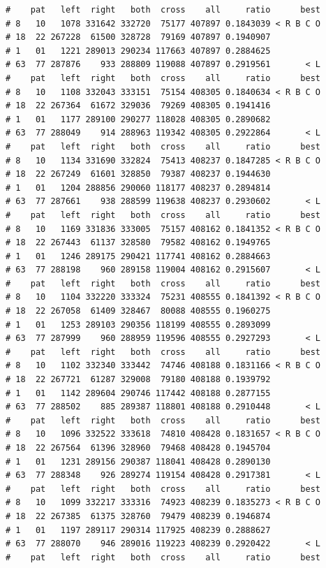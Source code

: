 \documentclass{article}\usepackage[]{graphicx}\usepackage[]{color}
\makeatletter
\newenvironment{kframe}{%
 \def\at@end@of@kframe{}%
 \ifinner\ifhmode%
  \def\at@end@of@kframe{\end{minipage}}%
  \begin{minipage}{\columnwidth}%
 \fi\fi%
 \def\FrameCommand##1{\hskip\@totalleftmargin \hskip-\fboxsep
 \colorbox{shadecolor}{##1}\hskip-\fboxsep
     \hskip-\linewidth \hskip-\@totalleftmargin \hskip\columnwidth}%
 \MakeFramed {\advance\hsize-\width
   \@totalleftmargin\z@ \linewidth\hsize
   \@setminipage}}%
 {\par\unskip\endMakeFramed%
 \at@end@of@kframe}
\newenvironment{knitrout}{}{} %
\makeatother
\begin{document}
\begin{knitrout}
\begin{kframe}
\begin{verbatim}
#    pat   left  right   both  cross    all     ratio      best
# 8   10   1078 331642 332720  75177 407897 0.1843039 < R B C O
# 18  22 267228  61500 328728  79169 407897 0.1940907          
# 1   01   1221 289013 290234 117663 407897 0.2884625          
# 63  77 287876    933 288809 119088 407897 0.2919561       < L
#    pat   left  right   both  cross    all     ratio      best
# 8   10   1108 332043 333151  75154 408305 0.1840634 < R B C O
# 18  22 267364  61672 329036  79269 408305 0.1941416          
# 1   01   1177 289100 290277 118028 408305 0.2890682          
# 63  77 288049    914 288963 119342 408305 0.2922864       < L
#    pat   left  right   both  cross    all     ratio      best
# 8   10   1134 331690 332824  75413 408237 0.1847285 < R B C O
# 18  22 267249  61601 328850  79387 408237 0.1944630          
# 1   01   1204 288856 290060 118177 408237 0.2894814          
# 63  77 287661    938 288599 119638 408237 0.2930602       < L
#    pat   left  right   both  cross    all     ratio      best
# 8   10   1169 331836 333005  75157 408162 0.1841352 < R B C O
# 18  22 267443  61137 328580  79582 408162 0.1949765          
# 1   01   1246 289175 290421 117741 408162 0.2884663          
# 63  77 288198    960 289158 119004 408162 0.2915607       < L
#    pat   left  right   both  cross    all     ratio      best
# 8   10   1104 332220 333324  75231 408555 0.1841392 < R B C O
# 18  22 267058  61409 328467  80088 408555 0.1960275          
# 1   01   1253 289103 290356 118199 408555 0.2893099          
# 63  77 287999    960 288959 119596 408555 0.2927293       < L
#    pat   left  right   both  cross    all     ratio      best
# 8   10   1102 332340 333442  74746 408188 0.1831166 < R B C O
# 18  22 267721  61287 329008  79180 408188 0.1939792          
# 1   01   1142 289604 290746 117442 408188 0.2877155          
# 63  77 288502    885 289387 118801 408188 0.2910448       < L
#    pat   left  right   both  cross    all     ratio      best
# 8   10   1096 332522 333618  74810 408428 0.1831657 < R B C O
# 18  22 267564  61396 328960  79468 408428 0.1945704          
# 1   01   1231 289156 290387 118041 408428 0.2890130          
# 63  77 288348    926 289274 119154 408428 0.2917381       < L
#    pat   left  right   both  cross    all     ratio      best
# 8   10   1099 332217 333316  74923 408239 0.1835273 < R B C O
# 18  22 267385  61375 328760  79479 408239 0.1946874          
# 1   01   1197 289117 290314 117925 408239 0.2888627          
# 63  77 288070    946 289016 119223 408239 0.2920422       < L
#    pat   left  right   both  cross    all     ratio      best

\end{verbatim}
\end{kframe}
\end{knitrout}
\end{document}
